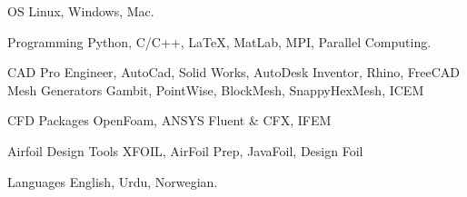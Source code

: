 

\begin{cvskills}
\cvskill
{OS} %
{Linux, Windows, Mac.} %

  \cvskill
    {Programming} %
    {Python, C/C++, LaTeX, MatLab, MPI, Parallel Computing.} %

  \cvskill
    {CAD} %
    {Pro Engineer, AutoCad, Solid Works, AutoDesk Inventor, Rhino, FreeCAD} %
\cvskill
{Mesh Generators} %
{Gambit, PointWise, BlockMesh, SnappyHexMesh, ICEM} %

\cvskill
{CFD Packages} %
{OpenFoam, ANSYS Fluent \& CFX, IFEM} %

\cvskill
{Airfoil Design Tools} %
{XFOIL, AirFoil Prep, JavaFoil, Design Foil} %

  \cvskill
    {Languages} %
    {English, Urdu, Norwegian.} %

\end{cvskills}
